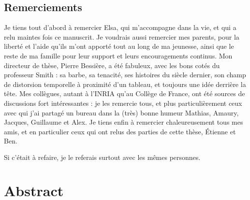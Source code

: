 \documentclass[a4paper,11pt,twoside]{memoir}
\def \myebookformat {false} %
\begin{document}
\section*{Remerciements}
Je tiens tout d'abord à remercier Elsa, qui m'accompagne dans la vie, et qui a relu maintes fois ce manuscrit. Je voudrais aussi remercier mes parents, pour la liberté et l'aide qu'ils m'ont apporté tout au long de ma jeunesse, ainsi que le reste de ma famille pour leur support et leurs encouragements continus. Mon directeur de thèse, Pierre Bessière, a été fabuleux, avec les bons cotés du professeur Smith : sa barbe, sa tenacité, ses histoires du siècle dernier, son champ de distorsion temporelle à proximité d'un tableau, et toujours une idée derrière la tête. Mes collègues, autant à l'INRIA qu'au Collège de France, ont été sources de discussions fort intéressantes : je les remercie tous, et plus particulièrement ceux avec qui j'ai partagé un bureau dans la (très) bonne humeur Mathias, Amaury, Jacques, Guillaume et Alex. Je tiens enfin à remercier chaleureusement tous mes amis, et en particulier ceux qui ont relus des parties de cette thèse, Étienne et Ben. 

Si c'était à refaire, je le referais surtout avec les mêmes personnes. 
\chapter*{Abstract}

\clearpage

\ifthenelse{\equal{\myebookformat}{false}}{
\dominitoc
\setcounter{tocdepth}{2}
}{}
\tableofcontents

\newcommand{\glos}[1]{\gls{#1}*}
\newcommand{\gloss}[1]{\glspl{#1}*}
\newcommand{\Glos}[1]{\Gls{#1}*}
\newcommand{\Gloss}[1]{\Glspl{#1}*}


\sloppy 












\printglossaries



\appendix


\end{document}
